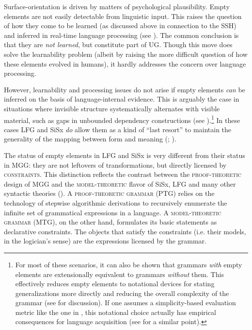 \documentclass[output=paper,hidelinks]{langscibook}
\begin{document}
Surface-orientation is driven by matters of psychological plausibility. Empty elements are not easily detectable from linguistic input. This raises the question of how they come to be learned (as discussed above in connection to the SSH) and inferred in real-time language processing (see \citealt{sag2011performance}). The common conclusion is that they are \textit{not learned}, but constitute part of UG. Though this move does solve the learnability problem (albeit by raising the more difficult question of how these elements evolved in humans), it hardly addresses the concern over language processing. %

However, learnability and processing issues do not arise if empty elements \textit{can} be inferred on the basis of  language-internal evidence. This is arguably the case in situations where invisible structure systematically alternates with visible material, such as gaps in unbounded dependency constructions (see \citealt{kluender1993bridging, clark2011linguistic}).\footnote{For most of these scenarios, it can also be shown that grammars \textit{with} empty elements are extensionally equivalent to grammars \textit{without} them. This effectively reduces empty elements to notational devices for stating generalizations more directly and reducing the overall complexity of the grammar (see \citet[chapter~19]{muller2018grammatical} for discussion). If one assumes a simplicity-based evaluation metric like the one in \citet{chomsky1951morphophonemics}, this notational choice actually has empirical consequences for language acquisition (see \citet[45]{chomsky1965aspects} for a similar point).} In these cases LFG and SiSx \textit{do} allow them as a kind of ``last resort'' to maintain the generality of the mapping between form and meaning (\citealt[193]{bresnan2001lexical}; \citealt[304]{culicover2005simpler}). 


The status of empty elements in LFG and SiSx is very different from their status in MGG: they are not leftovers of transformations, but directly licensed by \textsc{constraints}. This distinction reflects the contrast between the \textsc{proof-theoretic} design of MGG and the \textsc{model-theoretic} flavor of SiSx, LFG and many other syntactic theories (\citealt{pullum2001distinction, pullum2013central}). A \textsc{proof-theoretic grammar} (PTG) relies on the technology of stepwise algorithmic derivations to recursively enumerate the infinite set of grammatical expressions in a language. A \textsc{model-theoretic grammar} (MTG), on the other hand, formulates its basic statements as declarative constraints. The objects that satisfy the constraints (i.e. their models, in the logician's sense) are the expressions licensed by the grammar.%
\end{document}
